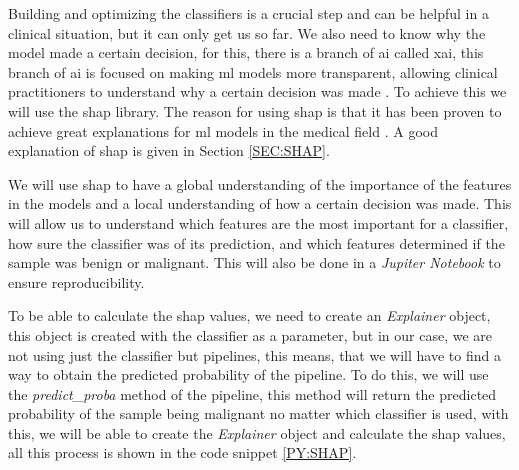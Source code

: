 Building and optimizing the classifiers is a crucial step and can be helpful in a clinical situation, but it can only get us so far. We also need to know why the model made a certain decision, for this, there is a branch of \ac{ai} called \acl{xai}, this branch of \ac{ai} is focused on making \ac{ml} models more transparent, allowing clinical practitioners to understand why a certain decision was made \cite{borys_explainable_2023}. To achieve this we will use the \acl{shap} library. The reason for using \ac{shap} is that it has been proven to achieve great explanations for \ac{ml} models in the medical field \cite{massafra_analyzing_2023}. A 
good 
explanation of \ac{shap} is given in Section \ref{SEC:SHAP}.


We will use \ac{shap} to have a global understanding of the importance of the features in the models and a local understanding of how a certain decision was made. This will allow us to understand which features are the most important for a classifier, how sure the classifier was of its prediction, and which features determined if the sample was benign or malignant. This will also be done in a \textit{Jupiter Notebook} to ensure reproducibility.

To be able to calculate the \ac{shap} values, we need to create an \textit{Explainer} object, this object is created with the classifier as a parameter, but in our case, we are not using just the classifier but pipelines, this means, that we will have to find a way to obtain the predicted probability of the pipeline. To do this, we will use the \textit{predict\_proba} method of the pipeline, this method will return the predicted probability of the sample being malignant no matter which classifier is used, with this, we will be able to create the \textit{Explainer} object and calculate the \ac{shap} values, all this process is shown in the code snippet \ref{PY:SHAP}.

